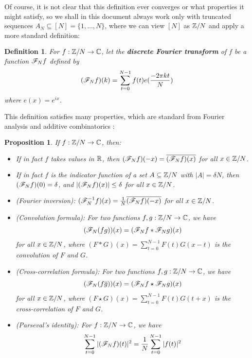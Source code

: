 \documentclass{report}
\newtheorem{proposition}[theorem]{Proposition}
\newtheorem{definition}[theorem]{Definition}
\theoremstyle{remark}
\numberwithin{equation}{section}
\begin{document}
Of course, it is not clear that this definition ever converges or what
properties it might satisfy, so we shall in this document always work
only with truncated sequences $A_N \subseteq [N] = \{1, \ldots, N\}$,
where we can view $[N]$ as $\mathbb{Z}/N$ and apply a more standard
definition:

\begin{definition}
  For $f : \mathbb{Z}/N \to \mathbb{C}$, let the \textbf{discrete Fourier transform}
  of $f$ be a function $\mathscr{F}_N f$ defined by
  \[(\mathscr{F}_N f)(k) = \sum_{t=0}^{N-1} f(t) e(\frac{-2\pi k t}{N})\]
  where $e(x) = e^{ix}$.
\end{definition}

This definition satisfies many properties, which are standard from
Fourier analysis and additive combinatorics \cite{tao:cup2006}:

\begin{proposition}\label{prop:fourier}
If $f : \mathbb{Z}/N \to \mathbb{C}$, then: 

\begin{itemize}
\item If in fact $f$ takes values in $\mathbb{R}$, then
  $(\mathscr{F}_N f)(-x) = \overline{(\mathscr{F}_N f)(x)}$ for all $x \in \mathbb{Z}/N$.

\item If in fact $f$ is the indicator function of a set
  $A \subseteq \mathbb{Z}/N$ with $|A| = \delta N$, then
  $(\mathscr{F}_N f)(0) = \delta$, and $|(\mathscr{F}_N f)(x)| \leq \delta$ for all
  $x \in \mathbb{Z}/N$.

\item (Fourier inversion):
  $(\mathscr{F}_N^{-1} f)(x) = \frac{1}{N} \overline{(\mathscr{F}_N f)(-x)}$ for all
  $x \in \mathbb{Z}/N$.

\item (Convolution formula): For two functions $f, g : \mathbb{Z}/N \to \mathbb{C}$,
  we have \[(\mathscr{F}_N (fg))(x) = (\mathscr{F}_N f \ast \mathscr{F}_N g)(x)\] for all
  $x \in \mathbb{Z}/N$, where $(F \ast G)(x) = \sum_{t=0}^{N-1} F(t)G(x-t)$ is
  the convolution of $F$ and $G$.

\item (Cross-correlation formula): For two functions
  $f, g : \mathbb{Z}/N \to \mathbb{C}$, we have
  \[(\mathscr{F}_N (f\overline{g}))(x) = (\mathscr{F}_N f \star \mathscr{F}_N g)(x)\] for
  all $x \in \mathbb{Z}/N$, where
  $(F \star G)(x) = \sum_{t=0}^{N-1} F(t)G(t+x)$ is the
  cross-correlation of $F$ and $G$.

\item (Parseval's identity): For $f : \mathbb{Z}/N \to \mathbb{C}$, we
  have
  \[\sum_{t=0}^{N-1} |(\mathscr{F}_N f)(t)|^2 = \frac{1}{N} \sum_{t=0}^{N-1}
    |f(t)|^2\]
\end{itemize}
\end{proposition}
\end{document}
